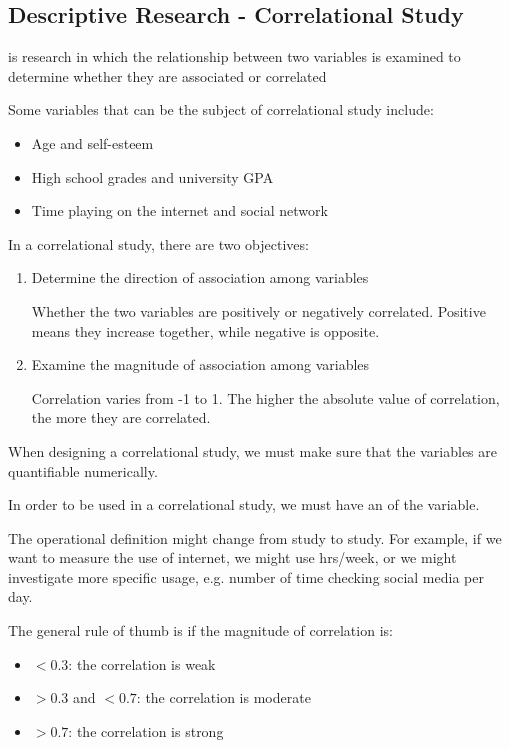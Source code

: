 \documentclass[../main/main.tex]{subfiles}
\begin{document}
\subsection{Descriptive Research - Correlational Study}
\begin{definition} is research in which the relationship between two variables is examined to determine whether they are associated or correlated
\end{definition}
\begin{example}
  Some variables that can be the subject of correlational study include:
\begin{itemize}
\item Age and self-esteem
  \item High school grades and university GPA
        \item Time playing on the internet and social network
\end{itemize}
\end{example}
In a correlational study, there are two objectives:
\begin{enumerate}
  \item Determine the direction of association among variables
        \begin{remark}
Whether the two variables are positively or negatively correlated. Positive means they increase together, while negative is opposite.
        \end{remark}
  \item Examine the magnitude of association among variables
        \begin{remark}
Correlation varies from -1 to 1. The higher the absolute value of correlation, the more they are correlated.
        \end{remark}
\end{enumerate}
When designing a correlational study, we must make sure that the variables are quantifiable numerically.
\begin{definition}
In order to be used in a correlational study, we must have an  of the variable.
\end{definition}
\begin{remark}
The operational definition might change from study to study. For example, if we want to measure the use of internet, we might use hrs/week, or we might investigate more specific usage, e.g. number of time checking social media per day.
\end{remark}
The general rule of thumb is if the magnitude of correlation is:
\begin{itemize}
  \item $< 0.3$: the correlation is weak
  \item $> 0.3$ and $< 0.7$: the correlation is moderate
        \item $>0.7$: the correlation is strong
\end{itemize}
\end{document}
